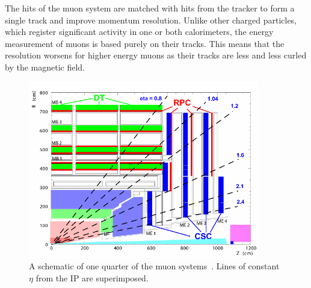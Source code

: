 The hits of the muon system are matched with hits from the tracker to form a single track and
improve momentum resolution. Unlike other charged particles, which register significant activity in
one or both calorimeters, the energy measurement of muons is based purely on their tracks. This means
that the resolution worsens for higher energy muons as their tracks are less and less curled by
the magnetic field.


\begin{figure}[ht]
 \begin{center}
   \includegraphics[width=0.90\textwidth]{figures/experiment/muons.pdf}
      \end{center}
\caption{A schematic of one quarter of the muon systems~\cite{Chatrchyan:2008zzk}.
Lines of constant $\eta$ from the IP are superimposed.}
\label{fig:muonsystem}
\end{figure}



